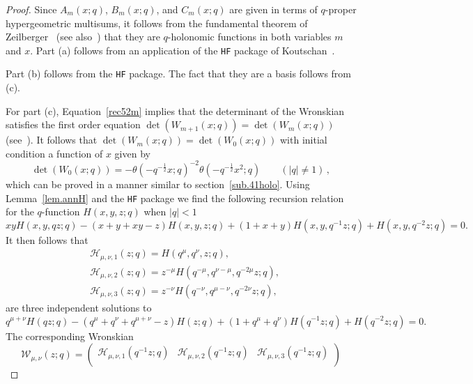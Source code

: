 \documentclass[12pt,reqno]{amsart}
\theoremstyle{definition}
\def\th{\theta}
\def\cH{\mathcal{H}}
\def\cW{\mathcal{W}}
\begin{document}
\begin{proof} Since $A_m(x;q)$, $B_m(x;q)$, and
  $C_m(x;q)$ are given in terms of $q$-proper hypergeometric
  multisums, it follows from the fundamental theorem of
  Zeilberger~\cite{Zeil:holo,WZ,PWZ} (see also~\cite{GL:survey}) that
  they are $q$-holonomic functions in both variables $m$ and $x$.
  Part (a) follows from an application of the
  \texttt{HF} package of Koutschan~\cite{Koutschan,
    Koutschan:holofunctions}.

  Part (b) follows from the \texttt{HF} package. The
  fact that they are a basis follows from (c).

  For part (c), Equation~\eqref{rec52m} implies that the determinant of
  the Wronskian satisfies the first order
  equation $\det(W_{m+1}(x;q))=\det(W_{m}(x;q))$
  (see~\cite[Lem.4.7]{GK:74}). It follows that
  $\det(W_m(x;q))=\det(W_0(x;q))$ with initial condition a
  function of $x$ given by
  \begin{equation}
    \label{W5200}
    \det(W_0(x;q)) = -\th(-q^{-\frac{1}{2}}x;q)^{-2}
    \th(-q^{-\frac{1}{2}}x^2;q)
    \qquad
    (|q| \neq 1) \,,
  \end{equation}
  which can be proved in a manner similar to section~\ref{sub.41holo}.
  Using Lemma~\ref{lem.annH} and the \texttt{HF} package we find the
  following recursion relation for the $q$-function $H(x,y,z;q)$ when
  $|q|<1$
  \begin{equation}
    x y H(x,y,q z;q) - (x+y+x y-z)H(x,y,z;q)
    +(1+x+y)H(x,y,q^{-1}z;q) + H(x,y,q^{-2}z;q) = 0.
    \label{eq:H-rec1}
  \end{equation}
  It then follows that
  \begin{align}
    &\cH_{\mu,\nu,1}(z;q) = H(q^{\mu},q^{\nu},z;q),\\
    &\cH_{\mu,\nu,2}(z;q) = z^{-\mu}H(q^{-\mu},q^{\nu-\mu},q^{-2\mu}z;q),\\
    &\cH_{\mu,\nu,3}(z;q) = z^{-\nu}H(q^{-\nu},q^{\mu-\nu},q^{-2\nu}z;q),
  \end{align}
  are three independent solutions to
  \begin{equation}
    q^{\mu+\nu} H(q z;q) - (q^\mu+q^\nu+q^{\mu+\nu}-z)H(z;q)
    +(1+q^\mu+q^\nu)H(q^{-1}z;q) + H(q^{-2}z;q) = 0.
  \end{equation}
  The corresponding Wronskian
  \begin{equation}
    \cW_{\mu,\nu}(z;q) =
    \begin{pmatrix}
      \cH_{\mu,\nu,1}(q^{-1}z;q) & \cH_{\mu,\nu,2}(q^{-1}z;q)
      & \cH_{\mu,\nu,3}(q^{-1}z;q)\\

\end{pmatrix}
\end{equation}
\end{proof}
\end{document}
